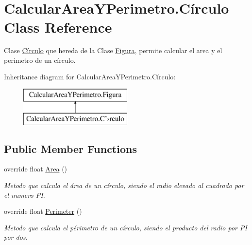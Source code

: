 \hypertarget{class_calcular_area_y_perimetro_1_1_c_xC3_xADrculo}{}\section{Calcular\+Area\+Y\+Perimetro.\+Círculo Class Reference}
\label{class_calcular_area_y_perimetro_1_1_c_xC3_xADrculo}


Clase \hyperlink{class_calcular_area_y_perimetro_1_1_c_xC3_xADrculo}{Círculo} que hereda de la Clase \hyperlink{class_calcular_area_y_perimetro_1_1_figura}{Figura}, permite calcular el area y el perimetro de un círculo.  


Inheritance diagram for Calcular\+Area\+Y\+Perimetro.\+Círculo\+:\begin{figure}[H]
\begin{center}
\leavevmode
\includegraphics[height=2.000000cm]{class_calcular_area_y_perimetro_1_1_c_xC3_xADrculo}
\end{center}
\end{figure}
\subsection*{Public Member Functions}
\begin{DoxyCompactItemize}
\item 
override float \hyperlink{class_calcular_area_y_perimetro_1_1_c_xC3_xADrculo_ad9f7ee8d44a155b4650194d4c927be08}{Area} ()
\begin{DoxyCompactList}\small\item\em Metodo que calcula el área de un círculo, siendo el radio elevado al cuadrado por el numero P\+I. \end{DoxyCompactList}\item 
override float \hyperlink{class_calcular_area_y_perimetro_1_1_c_xC3_xADrculo_a238460f007f422c1513875f28ba197c7}{Perimeter} ()
\begin{DoxyCompactList}\small\item\em Metodo que calcula el périmetro de un círculo, siendo el producto del radio por P\+I por dos. \end{DoxyCompactList}\end{DoxyCompactItemize}
